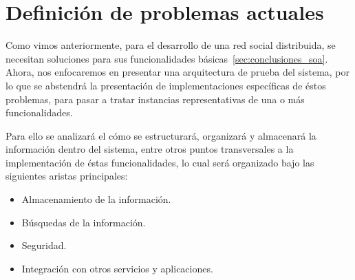

\section{Definición de problemas actuales}
\label{sec:problemas}

Como vimos anteriormente, para el desarrollo de una red social distribuida, se necesitan
soluciones para sus funcionalidades básicas~\ref{sec:conclusiones_soa}. Ahora,
nos enfocaremos en presentar una arquitectura de prueba del sistema, por lo que
se abstendrá la presentación de implementaciones específicas de
éstos problemas, para pasar a tratar instancias representativas de una o más
funcionalidades.

Para ello se analizará el cómo se estructurará, organizará y
almacenará la información dentro del sistema, entre otros puntos transversales a la
implementación de éstas funcionalidades, lo cual será organizado bajo las
siguientes aristas principales:


\begin{itemize}
    \item Almacenamiento de la información.
    \item Búsquedas de la información.
    \item Seguridad.
    \item Integración con otros servicios y aplicaciones.

\end{itemize}

